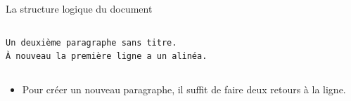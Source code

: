 \begin{frame}[fragile]{La structure logique du document}
\begin{columns}
\begin{column}{0.5\textwidth}
\begin{lstlisting}[style=nonumbers,mathescape]
Un deuxième paragraphe sans titre.
À nouveau la première ligne a un alinéa.
      \end{lstlisting}
    \end{column}
    \begin{column}{0.5\textwidth}
    \end{column}
  \end{columns}
  \begin{itemize}
  \item Pour créer un nouveau paragraphe, il suffit de faire deux retours à la ligne.
  \end{itemize}
\end{frame}
